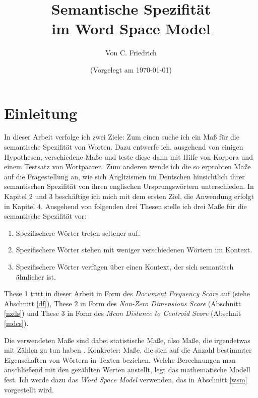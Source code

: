 \documentclass[11pt,numbers=noenddot]{scrartcl}
\title{Semantische Spezifität \\im Word Space Model}
\author{Von C. Friedrich}
\date{(Vorgelegt am \today)}
\begin{document}
\begin{titlepage}
\maketitle


\thispagestyle{empty}
\end{titlepage}

\tableofcontents
\newpage

\section{Einleitung}

In dieser Arbeit verfolge ich zwei Ziele: Zum einen suche ich ein Maß für die semantische Spezifität von Worten. Dazu entwerfe ich, ausgehend von einigen Hypothesen, verschiedene Maße und teste diese dann mit Hilfe von Korpora und einem Testsatz von Wortpaaren. Zum anderen wende ich die so erprobten Maße auf die Fragestellung an, wie sich Anglizismen im Deutschen hinsichtlich ihrer semantischen Spezifität von ihren englischen Ursprungswörtern unterschieden. In Kapitel 2 und 3 beschäftige ich mich mit dem ersten Ziel, die Anwendung erfolgt in Kapitel 4. Ausgehend von folgenden drei Thesen stelle ich drei Maße für die semantische Spezifität vor:
\begin{enumerate}
    \item Spezifischere Wörter treten seltener auf.
    \item Spezifischere Wörter stehen mit weniger verschiedenen Wörtern im Kontext.
    \item Spezifischere Wörter verfügen über einen Kontext, der sich semantisch ähnlicher ist.
\end{enumerate}

These 1 tritt in dieser Arbeit in Form des \emph{Document Frequency Score} auf (siehe Abschnitt \ref{df}), These 2 in Form des \emph{Non-Zero Dimensions Score} (Abschnitt \ref{nzds}) und These 3 in Form des \emph{Mean Distance to Centroid Score} (Abschnit \ref{mdcs}).

Die verwendeten Maße sind dabei statistische Maße, also Maße, die irgendetwas mit Zählen zu tun haben \citep[]{manning1999}. Konkreter: Maße, die sich auf die Anzahl bestimmter Eigenschaften von Wörtern in Texten beziehen. Welche Berechnungen man anschließend mit den gezählten Werten anstellt, legt das mathematische Modell fest. Ich werde dazu das \emph{Word Space Model} verwenden, das in Abschnitt \ref{wsm} vorgestellt wird.
\end{document}

